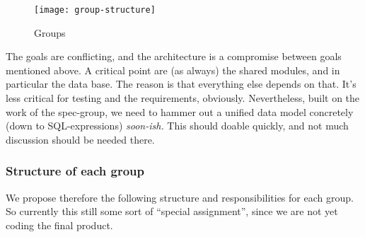 \documentclass[11pt,handout]{handout}
\begin{document}
{

\begin{figure}[htbp]
  \centering
  \texttt{[image: group-structure]}  
  \caption{Groups}
  \label{fig:groups}
\end{figure}



The goals are conflicting, and the architecture is a compromise between
goals mentioned above. A critical point are (as always) the shared modules,
and in particular the data base. The reason is that everything else depends
on that. It's less critical for testing and the requirements, obviously.
Nevertheless, built on the work of the spec-group, we need to hammer out a
unified data model concretely (down to SQL-expressions) \emph{soon-ish.}
This should doable quickly, and not much discussion should be needed there.



\subsubsection*{Structure of each group}

We propose therefore the following structure and responsibilities for each
group. So currently this still some sort of ``special assignment'', since
we are not yet coding the final product.

}
\end{document}
